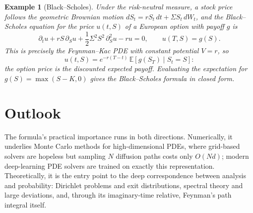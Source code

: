 \documentclass{article}
\newtheorem{example}{Example}
\newcommand{\concept}[2]{#1}
\begin{document}
\begin{example}[Black--Scholes]
Under the risk-neutral measure, a stock price follows the geometric Brownian motion $dS_t = r S_t\,dt + \Sigma S_t\,dW_t$, and the \concept{Black--Scholes equation}{black-scholes} for the price $u(t,S)$ of a European option with payoff $g$ is
\[
\partial_t u + r S\, \partial_S u + \frac{1}{2} \Sigma^2 S^2\, \partial_S^2 u - r u = 0, \qquad u(T, S) = g(S).
\]
This is precisely the Feynman--Kac PDE with constant potential $V = r$, so
\[
u(t, S) = e^{-r (T-t)}\, \mathbb{E}\left[ g(S_T) \mid S_t = S \right] :
\]
the option price is the discounted expected payoff. Evaluating the expectation for $g(S) = \max(S - K, 0)$ gives the Black--Scholes formula in closed form.
\end{example}

\section{Outlook}

The formula's practical importance runs in both directions. Numerically, it underlies Monte Carlo methods for high-dimensional PDEs, where grid-based solvers are hopeless but sampling $N$ diffusion paths costs only $O(N d)$; modern deep-learning PDE solvers are trained on exactly this representation. Theoretically, it is the entry point to the deep correspondence between analysis and probability: Dirichlet problems and exit distributions, spectral theory and large deviations, and, through its imaginary-time relative, Feynman's path integral itself.
\end{document}
